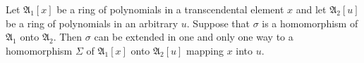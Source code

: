 Let $\mathfrak{A}_1[x]$ be a ring of polynomials in a transcendental element $x$ and let $\mathfrak{A}_2[u]$ be a ring of polynomials in an arbitrary $u$. Suppose that $\sigma$ is a homomorphism of $\mathfrak{A}_1$ onto $\mathfrak{A}_2$. Then $\sigma$ can be extended in one and only one way to a homomorphism $\Sigma$ of $\mathfrak{A}_1[x]$ onto $\mathfrak{A}_2[u]$ mapping $x$ into $u$.
